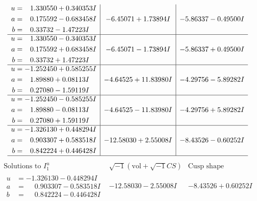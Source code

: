 \documentclass[1p]{elsarticle_modified}
\theoremstyle{definition}
\newcommand{\I}{\sqrt{-1}}
\begin{document}
$$\begin{array}{c|c|c}
\begin{aligned}
u &= \phantom{-}1.330550 + 0.340353 I \\
a &= \phantom{-}0.175592 - 0.683458 I \\
b &= \phantom{-}0.33732 - 1.47223 I\end{aligned}
 & -6.45071 + 1.73894 I & -5.86337 - 0.49500 I \\ \hline\begin{aligned}
u &= \phantom{-}1.330550 - 0.340353 I \\
a &= \phantom{-}0.175592 + 0.683458 I \\
b &= \phantom{-}0.33732 + 1.47223 I\end{aligned}
 & -6.45071 - 1.73894 I & -5.86337 + 0.49500 I \\ \hline\begin{aligned}
u &= -1.252450 + 0.585255 I \\
a &= \phantom{-}1.89880 + 0.08113 I \\
b &= \phantom{-}0.27080 - 1.59119 I\end{aligned}
 & -4.64525 + 11.83980 I & -4.29756 - 5.89282 I \\ \hline\begin{aligned}
u &= -1.252450 - 0.585255 I \\
a &= \phantom{-}1.89880 - 0.08113 I \\
b &= \phantom{-}0.27080 + 1.59119 I\end{aligned}
 & -4.64525 - 11.83980 I & -4.29756 + 5.89282 I \\ \hline\begin{aligned}
u &= -1.326130 + 0.448294 I \\
a &= \phantom{-}0.903307 + 0.583518 I \\
b &= \phantom{-}0.842224 + 0.446428 I\end{aligned}
 & -12.58030 + 2.55008 I & -8.43526 - 0.60252 I\\
 \hline 
 \end{array}$$\newpage$$\begin{array}{c|c|c}  
\text{Solutions to }I^u_{1}& \I (\text{vol} + \sqrt{-1}CS) & \text{Cusp shape}\\
 \hline 
\begin{aligned}
u &= -1.326130 - 0.448294 I \\
a &= \phantom{-}0.903307 - 0.583518 I \\
b &= \phantom{-}0.842224 - 0.446428 I\end{aligned}
 & -12.58030 - 2.55008 I & -8.43526 + 0.60252 I \\ \hline\begin{aligned}

\end{aligned}
\end{array}$$
\end{document}
